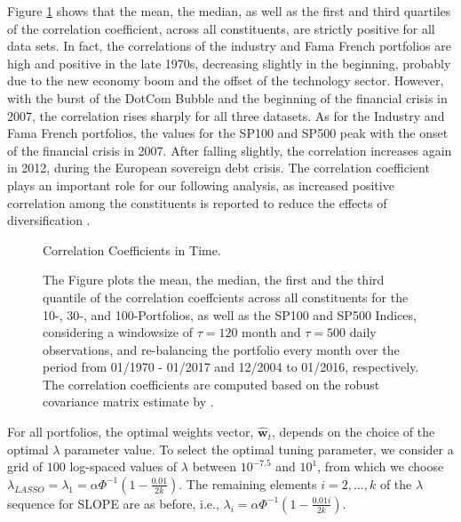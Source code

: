 \documentclass[12pt, a4paper]{article}
\newcommand{\bfw}{\boldsymbol{w} }
\begin{document}
\noindent
Figure \ref{CorrelCoeffs_Ind} shows that the mean, the median, as well as the first and third quartiles of the correlation coefficient, across all constituents, are strictly positive for all data sets. In fact, the correlations of the industry and Fama French portfolios are high and positive in the late 1970s, decreasing slightly in the beginning, probably due to the new economy boom and the offset of the technology sector. However, with the burst of the DotCom Bubble and the beginning of the financial crisis in 2007, the correlation rises sharply for all three datasets. As for the Industry and Fama French portfolios, the values for the SP100 and SP500 peak with the onset of the financial crisis in 2007. After falling slightly, the correlation increases again in 2012, during the European sovereign debt crisis. The correlation coefficient plays an important role for our following analysis, as increased positive correlation among the constituents is reported to reduce the effects of diversification \citep{Choueifaty2008, You2010, Giuzio2016a}.
%
\begin{figure}[h!]
\centering
\caption{Correlation Coefficients in Time.} \label{CorrelCoeffs_Ind}
\captionsetup{font=scriptsize,labelfont=scriptsize, width=\textwidth}
\caption*{The Figure plots the mean, the median, the first and the third quantile of the correlation coeffcients across all constituents for the 10-, 30-, and 100-Portfolios, as well as the SP100 and SP500 Indices, considering a windowsize of $\tau = 120$ month and $\tau =500$ daily observations, and re-balancing the portfolio every month over the period from 01/1970 - 01/2017 and 12/2004 to 01/2016, respectively. The correlation coefficients are computed based on the robust covariance matrix estimate by \cite{Ledoit2004}.}
\end{figure}
%
\noindent
For all portfolios, the optimal weights vector, $\hat{\bfw}_{t}$, depends on the choice of the optimal $\lambda$ parameter value. To select the optimal tuning parameter, we consider a grid of $100$ log-spaced values of $\lambda$ between $10^{-7.5}$ and $10^{1}$, from which we choose $\lambda_{LASSO} = \lambda_{1}=\alpha \Phi^{-1}\left(1-\frac{0.01}{2k}\right)$. The remaining elements $i=2,...,k$ of the $\lambda$ sequence for SLOPE are as before, i.e., $\lambda_{i}=\alpha \Phi^{-1}\left(1-\frac{0.01 i}{2k}\right)$.\\ %
\end{document}
